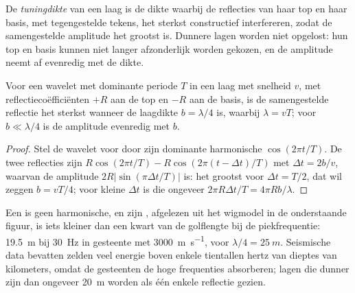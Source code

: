 \begin{definition}[Tuningdikte]\label{def:b3:exploration-seismology:resolution}
De \emph{tuningdikte} van een laag is de dikte waarbij de reflecties van
haar top en haar basis, met tegengestelde tekens, het sterkst constructief interfereren,
zodat de samengestelde amplitude het grootst is. Dunnere lagen worden niet opgelost: hun
top en basis kunnen niet langer afzonderlijk worden gekozen, en de amplitude neemt af
evenredig met de dikte.
\end{definition}

\begin{proposition}[Kwartgolflengteregel]\label{prop:b3:exploration-seismology:tuning}
Voor een wavelet met dominante periode $T$ in een laag met snelheid $v$, met
reflectiecoëfficiënten $+R$ aan de top en $-R$ aan de basis, is de samengestelde reflectie
het sterkst wanneer de laagdikte $b = \lambda/4$ is, waarbij $\lambda = vT$; voor
$b \ll \lambda/4$ is de amplitude evenredig met $b$.
\end{proposition}

\begin{proof}
Stel de wavelet voor door zijn dominante harmonische $\cos(2\pi t/T)$. De twee
reflecties zijn $R\cos(2\pi t/T) - R\cos(2\pi(t - \Delta t)/T)$ met
$\Delta t = 2b/v$, waarvan de amplitude $2R|\sin(\pi\Delta t/T)|$ is: het grootst voor
$\Delta t = T/2$, dat wil zeggen $b = vT/4$; voor kleine $\Delta t$ is die ongeveer
$2\pi R\Delta t/T = 4\pi Rb/\lambda$.
\end{proof}

Een  is geen harmonische, en zijn , afgelezen uit het wigmodel
in de onderstaande figuur, is iets kleiner dan een kwart van de golflengte bij de
piekfrequentie: \qty{19.5}{m} bij \qty{30}{Hz} in gesteente met
\qty{3000}{m.s^{-1}}, voor $\lambda/4 = \qty{25}{m}$. Seismische data bevatten zelden
veel energie boven enkele tientallen hertz van dieptes van kilometers, omdat de
gesteenten de hoge frequenties absorberen; lagen die dunner zijn dan ongeveer
\qty{20}{m} worden als één enkele reflectie gezien.

